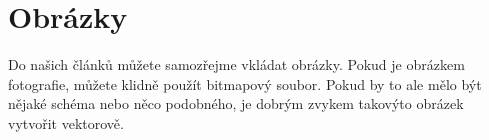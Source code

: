 \documentclass[a4paper,11pt]{article}
\begin{document}
	\section{Obrázky}
	Do našich článků můžete samozřejme	vkládat obrázky. Pokud je obrázkem fotografie, můžete klidně použít bitmapový soubor. Pokud by to ale mělo být nějaké schéma nebo něco podobného, je dobrým zvykem takovýto obrázek vytvořit vektorově.
	\begin{figure}[H]
		
		\centering
\end{figure}
\end{document}

